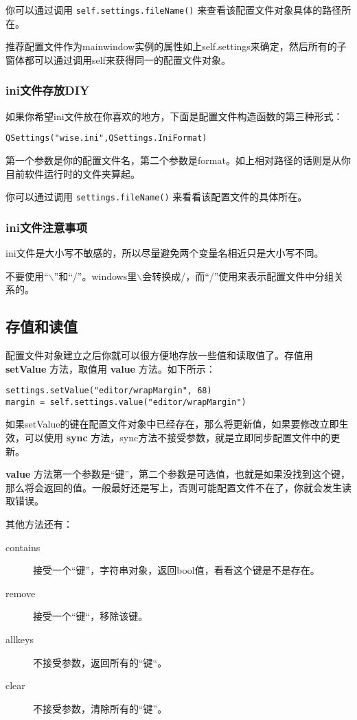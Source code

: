 \documentclass[11pt,oneside]{article}
\begin{document}
你可以通过调用 \texttt{self.settings.fileName()} 来查看该配置文件对象具体的路径所在。

推荐配置文件作为mainwindow实例的属性如上self.settings来确定，然后所有的子窗体都可以通过调用self来获得同一的配置文件对象。

\subsubsection{ini文件存放DIY}
\label{sec:orgheadline27}
如果你希望ini文件放在你喜欢的地方，下面是配置文件构造函数的第三种形式：
\begin{Verbatim}
QSettings("wise.ini",QSettings.IniFormat)
\end{Verbatim}

第一个参数是你的配置文件名，第二个参数是format。如上相对路径的话则是从你目前软件运行时的文件夹算起。

你可以通过调用 \texttt{settings.fileName()} 来看看该配置文件的具体所在。

\subsubsection{ini文件注意事项}
\label{sec:orgheadline28}
ini文件是大小写不敏感的，所以尽量避免两个变量名相近只是大小写不同。

不要使用“$\backslash$”和“/”。windows里$\backslash$会转换成/，而“/”使用来表示配置文件中分组关系的。


\subsection{存值和读值}
\label{sec:orgheadline30}
配置文件对象建立之后你就可以很方便地存放一些值和读取值了。存值用 \textbf{setValue} 方法，取值用 \textbf{value} 方法。如下所示：
\begin{Verbatim}
settings.setValue("editor/wrapMargin", 68)
margin = self.settings.value("editor/wrapMargin")
\end{Verbatim}

如果setValue的键在配置文件对象中已经存在，那么将更新值，如果要修改立即生效，可以使用 \textbf{sync} 方法，sync方法不接受参数，就是立即同步配置文件中的更新。

\textbf{value} 方法第一个参数是“键”，第二个参数是可选值，也就是如果没找到这个键，那么将会返回的值。一般最好还是写上，否则可能配置文件不在了，你就会发生读取错误。


其他方法还有：
\begin{description}
\item[{contains}] 接受一个“键”，字符串对象，返回bool值，看看这个键是不是存在。
\item[{remove}] 接受一个“键“，移除该键。
\item[{allkeys}] 不接受参数，返回所有的“键“。
\item[{clear}] 不接受参数，清除所有的“键”。
\end{description}
\end{document}
